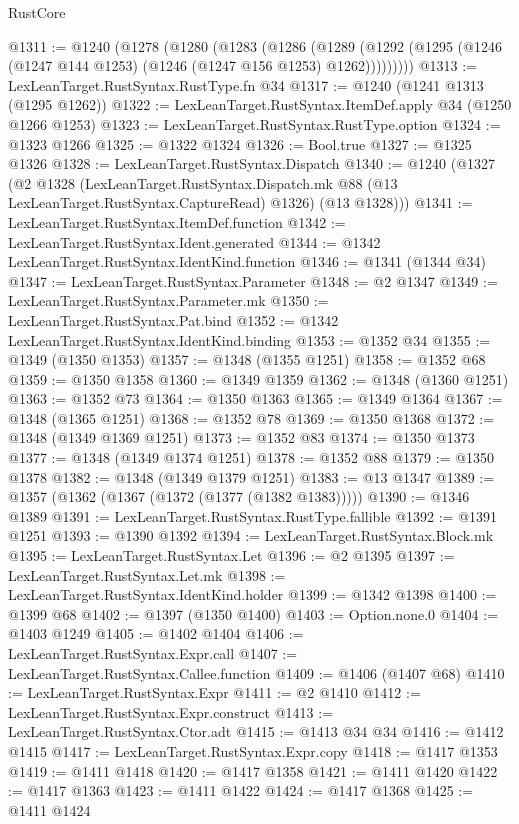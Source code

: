 \begin{lexlean}{RustCore}
\begin{coremodule}
{\begin{coremodule}
{{{{{{{{{{{{{{{{{{{{{{{{{{{{{{{{{{{{{{{{{{{{{@1311 := @1240
    (@1278
      (@1280
        (@1283
          (@1286
            (@1289 (@1292 (@1295 (@1246 (@1247 @144 @1253) (@1246 (@1247 @156 @1253) @1262)))))))))
@1313 := LexLeanTarget.RustSyntax.RustType.fn @34
@1317 := @1240 (@1241 @1313 (@1295 @1262))
@1322 := LexLeanTarget.RustSyntax.ItemDef.apply @34 (@1250 @1266 @1253)
@1323 := LexLeanTarget.RustSyntax.RustType.option
@1324 := @1323 @1266
@1325 := @1322 @1324
@1326 := Bool.true
@1327 := @1325 @1326
@1328 := LexLeanTarget.RustSyntax.Dispatch
@1340 := @1240
    (@1327
      (@2
        @1328
        (LexLeanTarget.RustSyntax.Dispatch.mk @88 (@13 LexLeanTarget.RustSyntax.CaptureRead) @1326)
        (@13 @1328)))
@1341 := LexLeanTarget.RustSyntax.ItemDef.function
@1342 := LexLeanTarget.RustSyntax.Ident.generated
@1344 := @1342 LexLeanTarget.RustSyntax.IdentKind.function
@1346 := @1341 (@1344 @34)
@1347 := LexLeanTarget.RustSyntax.Parameter
@1348 := @2 @1347
@1349 := LexLeanTarget.RustSyntax.Parameter.mk
@1350 := LexLeanTarget.RustSyntax.Pat.bind
@1352 := @1342 LexLeanTarget.RustSyntax.IdentKind.binding
@1353 := @1352 @34
@1355 := @1349 (@1350 @1353)
@1357 := @1348 (@1355 @1251)
@1358 := @1352 @68
@1359 := @1350 @1358
@1360 := @1349 @1359
@1362 := @1348 (@1360 @1251)
@1363 := @1352 @73
@1364 := @1350 @1363
@1365 := @1349 @1364
@1367 := @1348 (@1365 @1251)
@1368 := @1352 @78
@1369 := @1350 @1368
@1372 := @1348 (@1349 @1369 @1251)
@1373 := @1352 @83
@1374 := @1350 @1373
@1377 := @1348 (@1349 @1374 @1251)
@1378 := @1352 @88
@1379 := @1350 @1378
@1382 := @1348 (@1349 @1379 @1251)
@1383 := @13 @1347
@1389 := @1357 (@1362 (@1367 (@1372 (@1377 (@1382 @1383)))))
@1390 := @1346 @1389
@1391 := LexLeanTarget.RustSyntax.RustType.fallible
@1392 := @1391 @1251
@1393 := @1390 @1392
@1394 := LexLeanTarget.RustSyntax.Block.mk
@1395 := LexLeanTarget.RustSyntax.Let
@1396 := @2 @1395
@1397 := LexLeanTarget.RustSyntax.Let.mk
@1398 := LexLeanTarget.RustSyntax.IdentKind.holder
@1399 := @1342 @1398
@1400 := @1399 @68
@1402 := @1397 (@1350 @1400)
@1403 := Option.none.{0}
@1404 := @1403 @1249
@1405 := @1402 @1404
@1406 := LexLeanTarget.RustSyntax.Expr.call
@1407 := LexLeanTarget.RustSyntax.Callee.function
@1409 := @1406 (@1407 @68)
@1410 := LexLeanTarget.RustSyntax.Expr
@1411 := @2 @1410
@1412 := LexLeanTarget.RustSyntax.Expr.construct
@1413 := LexLeanTarget.RustSyntax.Ctor.adt
@1415 := @1413 @34 @34
@1416 := @1412 @1415
@1417 := LexLeanTarget.RustSyntax.Expr.copy
@1418 := @1417 @1353
@1419 := @1411 @1418
@1420 := @1417 @1358
@1421 := @1411 @1420
@1422 := @1417 @1363
@1423 := @1411 @1422
@1424 := @1417 @1368
@1425 := @1411 @1424
}}}}}}}}}}}}}}}}}}}}}}}}}}}}}}}}}}}}}}}}}}}}}
\end{coremodule}}
\end{coremodule}
\end{lexlean}
